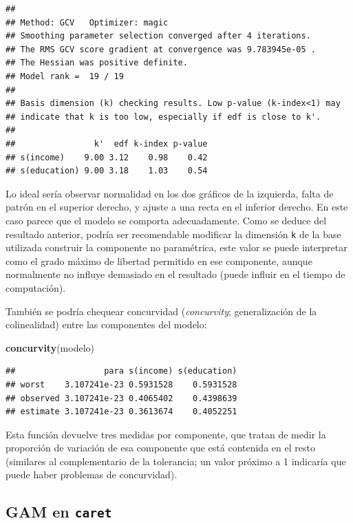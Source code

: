 \documentclass[
  spanish,
]{book}
\newenvironment{Shaded}{\begin{snugshade}}{\end{snugshade}}
\newcommand{\KeywordTok}[1]{\textcolor[rgb]{0.13,0.29,0.53}{\textbf{#1}}}
\newcommand{\NormalTok}[1]{#1}
\theoremstyle{break}
\theoremstyle{definition}
\theoremstyle{definition}
\theoremstyle{definition}
\theoremstyle{remark}
\begin{document}
\begin{verbatim}
## 
## Method: GCV   Optimizer: magic
## Smoothing parameter selection converged after 4 iterations.
## The RMS GCV score gradient at convergence was 9.783945e-05 .
## The Hessian was positive definite.
## Model rank =  19 / 19 
## 
## Basis dimension (k) checking results. Low p-value (k-index<1) may
## indicate that k is too low, especially if edf is close to k'.
## 
##                k'  edf k-index p-value
## s(income)    9.00 3.12    0.98    0.42
## s(education) 9.00 3.18    1.03    0.54
\end{verbatim}

Lo ideal sería observar normalidad en los dos gráficos de la izquierda, falta de patrón en el superior derecho, y ajuste a una recta en el inferior derecho. En este caso parece que el modelo se comporta adecuadamente.
Como se deduce del resultado anterior, podría ser recomendable modificar la dimensión \texttt{k} de la base utilizada construir la componente no paramétrica, este valor se puede interpretar como el grado máximo de libertad permitido en ese componente, aunque normalmente no influye demasiado en el resultado (puede influir en el tiempo de computación).

También se podría chequear concurvidad (\emph{concurvity}; generalización de la colinealidad) entre las componentes del modelo:

\begin{Shaded}
\begin{Highlighting}[]
\KeywordTok{concurvity}\NormalTok{(modelo)}
\end{Highlighting}
\end{Shaded}

\begin{verbatim}
##                  para s(income) s(education)
## worst    3.107241e-23 0.5931528    0.5931528
## observed 3.107241e-23 0.4065402    0.4398639
## estimate 3.107241e-23 0.3613674    0.4052251
\end{verbatim}

Esta función devuelve tres medidas por componente, que tratan de medir la proporción de variación de esa componente que está contenida en el resto (similares al complementario de la tolerancia; un valor próximo a 1 indicaría que puede haber problemas de concurvidad).

\hypertarget{gam-en-caret}{%
\subsection{\texorpdfstring{GAM en \texttt{caret}}{GAM en caret}}\label{gam-en-caret}}
\end{document}
